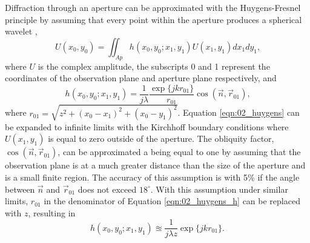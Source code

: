 Diffraction through an aperture can be approximated with the Huygens-Fresnel principle by assuming that every point within the aperture produces a spherical wavelet \cite{Huygens-1690-gD8nxCn8},
\begin{equation}
  U(x_0,y_0) = \iint_{Ap} h(x_0,y_0;x_1,y_1)U(x_1,y_1)dx_1dy_1 \textrm{,}
  \label{eqn:02_huygens}
\end{equation}
where $U$ is the complex amplitude, the subscripts 0 and 1 represent the coordinates of the observation plane and aperture plane respectively, and
\begin{equation}
  h(x_0,y_0;x_1,y_1) = \frac{1}{j\lambda}\frac{\exp\{jkr_{01}\}}{r_{01}}\cos(\overrightarrow{n},\overrightarrow{r}_{01}) \textrm{,}
  \label{eqn:02_huygens_h}
\end{equation}
where $r_{01} = \sqrt{z^2+(x_0-x_1)^2+(x_0-y_1)^2}$.
Equation \ref{eqn:02_huygens} can be expanded to infinite limits with the Kirchhoff boundary conditions where $U(x_1,y_1)$ is equal to zero outside of the aperture.
The obliquity factor, $\cos(\overrightarrow{n},\overrightarrow{r}_{01})$, can be approximated a being equal to one by assuming that the observation plane is at a much greater distance than the size of the aperture and is a small finite region.
The accuracy of this assumption is with 5\% if the angle between  $\overrightarrow{n}$ and $\overrightarrow{r}_{01}$ does not exceed $18^\circ$\cite{Goodman-1968-zPUmuuzx}.
With this assumption under similar limits, $r_{01}$ in the denominator of Equation \ref{eqn:02_huygens_h} can be replaced with $z$, resulting in
\begin{equation}
  h(x_0,y_0;x_1,y_1) \approxeq \frac{1}{j\lambda z}\exp\{jkr_{01}\} \textrm{.}
\end{equation}

